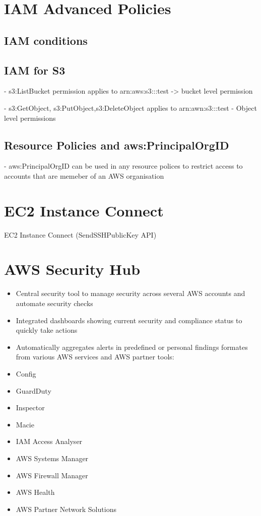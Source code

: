 \section{IAM Advanced Policies}

\subsection{IAM conditions}


\subsection{IAM for S3}
- s3:ListBucket permission applies to arn:aws:s3:::test -> bucket level permission

- s3:GetObject, s3:PutObject,s3:DeleteObject applies to arn:awn:s3:::test
- Object level permissions

\subsection{Resource Policies and aws:PrincipalOrgID}
- aws:PrincipalOrgID can be used in any resource polices to restrict access to accounts that are memeber of an AWS organisation


\section{EC2 Instance Connect}
EC2 Instance Connect (SendSSHPublicKey API)


\section{AWS Security Hub}
\begin{itemize}
    \item Central security tool to manage security across several AWS accounts and automate security checks
    \item Integrated dashboards showing current security and compliance status to quickly take actions
    \item Automatically aggregates alerts in predefined or personal findings formates from various AWS services and AWS partner tools:
    \item Config
    \item GuardDuty
    \item Inspector
    \item Macie
    \item IAM Access Analyser
    \item AWS Systems Manager
    \item AWS Firewall Manager
    \item AWS Health
    \item AWS Partner Network Solutions
\end{itemize}

